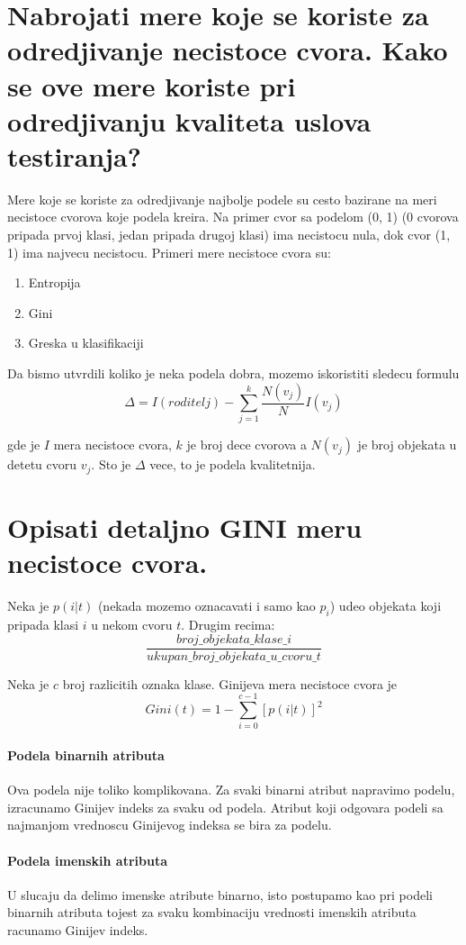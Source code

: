 \documentclass[a4paper]{article}
\begin{document}
\section{Nabrojati mere koje se koriste za odredjivanje necistoce cvora. Kako se ove mere koriste
pri odredjivanju kvaliteta uslova testiranja?}
Mere koje se koriste za odredjivanje najbolje podele su cesto bazirane na meri necistoce cvorova
koje podela kreira. Na primer cvor sa podelom (0, 1) (0 cvorova pripada prvoj klasi, jedan pripada
drugoj klasi) ima necistocu nula, dok cvor (1, 1) ima najvecu necistocu. Primeri mere necistoce
cvora su:
\begin{enumerate}
    \item Entropija
    \item Gini
    \item Greska u klasifikaciji
\end{enumerate}

Da bismo utvrdili koliko je neka podela dobra, mozemo iskoristiti sledecu formulu
\[
    \label{formula_kvalitet_podele}
    \Delta = I(roditelj) - \sum_{j=1}^{k} \dfrac{N(v_j)}{N}I(v_j)
\]

gde je \(I\) mera necistoce cvora, \(k\) je broj dece cvorova a \(N(v_j)\) je broj objekata u
detetu cvoru \(v_j\). Sto je \(\Delta\) vece, to je podela kvalitetnija.

\section{Opisati detaljno GINI meru necistoce cvora.}
Neka je \(p(i|t)\) (nekada mozemo oznacavati i samo kao \(p_i\)) udeo objekata koji pripada klasi
\(i\) u nekom cvoru \(t\). Drugim recima:
\[
    \dfrac{broj\_objekata\_klase\_i}{ukupan\_broj\_objekata\_u\_cvoru\_t}
\]

Neka je \(c\) broj razlicitih oznaka klase. Ginijeva mera necistoce cvora je
\[
    Gini(t) = 1 - \sum_{i=0}^{c-1} [p(i|t)]^2
\]

\paragraph{Podela binarnih atributa} Ova podela nije toliko komplikovana. Za svaki binarni atribut
napravimo podelu, izracunamo Ginijev indeks za svaku od podela. Atribut koji odgovara podeli sa
najmanjom vrednoscu Ginijevog indeksa se bira za podelu.

\paragraph{Podela imenskih atributa} U slucaju da delimo imenske atribute binarno, isto postupamo
kao pri podeli binarnih atributa tojest za svaku kombinaciju vrednosti imenskih atributa racunamo
Ginijev indeks.
\end{document}
